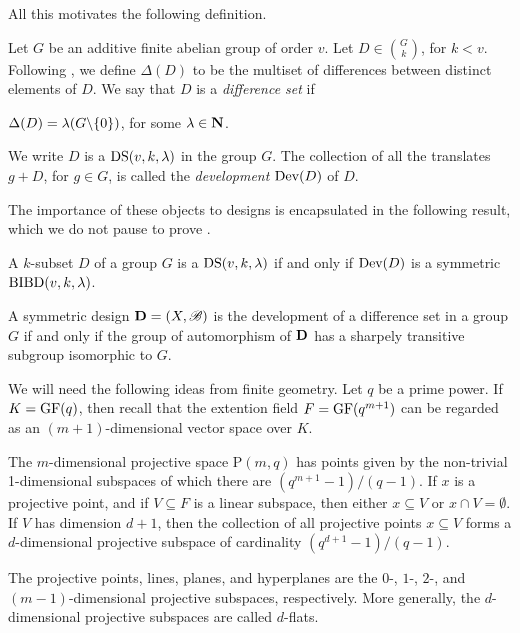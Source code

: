 \documentclass[../../../main]{subfiles}
\begin{document}
 All this motivates the following definition.

\begin{defin}\label{difference-set-defin}
 Let $G$ be an additive finite abelian group of order $v$. Let $D \in \binom{G}{k}$, for $k < v$. Following \cite{design-theory-v1}, we define $\Delta(D)$ to be the multiset of differences between distinct elements of $D$. We say that $D$ is a {\it difference set} if
 \begin{defenum}
 \item\label{diff-set-eq} $\Delta(D)=\lambda(G\backslash\{0\})$, for some $\lambda \in \mathbf{N}$. 
 \end{defenum}
 We write $D$ is a $\text{DS}(v,k,\lambda)$ in the group $G$. The collection of all the translates $g+D$, for $g \in G$, is called the {\it development} $\text{Dev}(D)$ of $D$.
\end{defin}

The importance of these objects to designs is encapsulated in the following result, which we do not pause to prove \cite[see][Theorem 11.1.2]{combinatorial-theory}.

\begin{thm}
 A $k$-subset $D$ of a group $G$ is a $\text{DS}(v,k,\lambda)$ if and only if $\text{Dev}(D)$ is a symmetric $\text{BIBD}(v,k,\lambda)$.
\end{thm}

\begin{cor}
 A symmetric design $\mathbf{D}=(X,\mathscr{B})$ is the development of a difference set in a group $G$ if and only if the group of automorphism of $\mathbf{D}$ has a sharpely transitive subgroup isomorphic to $G$.
\end{cor}

We will need the following ideas from finite geometry. Let $q$ be a prime power. If $K=\text{GF}(q)$, then recall that the extention field $F=\text{GF}(q^{m+1})$ can be regarded as an $(m+1)$-dimensional vector space over $K$. 

The $m$-dimensional projective space P$(m,q)$ has points given by the non-trivial 1-dimensional subspaces of which there are $(q^{m+1}-1)/(q-1)$. If $x$ is a projective point, and if $V \subseteq F$ is a linear subspace, then either $x \subseteq V$ or $x \cap V = \emptyset$. If $V$ has dimension $d+1$, then the collection of all projective points $x \subseteq V$ forms a $d$-dimensional projective subspace of cardinality $(q^{d+1}-1)/(q-1)$.

The projective points, lines, planes, and hyperplanes are the $0$-, $1$-, $2$-, and $(m-1)$-dimensional projective subspaces, respectively. More generally, the $d$-dimensional projective subspaces are called $d$-flats.
\end{document}
